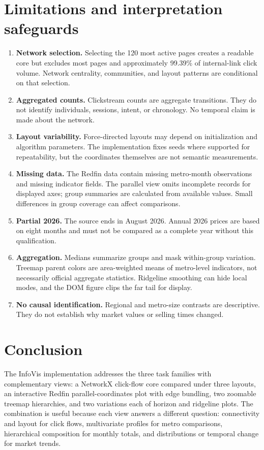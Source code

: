 \documentclass[11pt,letterpaper]{article}
\begin{document}
\section{Limitations and interpretation safeguards}
\begin{enumerate}[leftmargin=*]
  \item \textbf{Network selection.} Selecting the 120 most active pages creates a readable core but excludes most pages and approximately 99.39\% of internal-link click volume. Network centrality, communities, and layout patterns are conditional on that selection.
  \item \textbf{Aggregated counts.} Clickstream counts are aggregate transitions. They do not identify individuals, sessions, intent, or chronology. No temporal claim is made about the network.
  \item \textbf{Layout variability.} Force-directed layouts may depend on initialization and algorithm parameters. The implementation fixes seeds where supported for repeatability, but the coordinates themselves are not semantic measurements.
  \item \textbf{Missing data.} The Redfin data contain missing metro-month observations and missing indicator fields. The parallel view omits incomplete records for displayed axes; group summaries are calculated from available values. Small differences in group coverage can affect comparisons.
  \item \textbf{Partial 2026.} The source ends in August 2026. Annual 2026 prices are based on eight months and must not be compared as a complete year without this qualification.
  \item \textbf{Aggregation.} Medians summarize groups and mask within-group variation. Treemap parent colors are area-weighted means of metro-level indicators, not necessarily official aggregate statistics. Ridgeline smoothing can hide local modes, and the DOM figure clips the far tail for display.
  \item \textbf{No causal identification.} Regional and metro-size contrasts are descriptive. They do not establish why market values or selling times changed.
\end{enumerate}

\section{Conclusion}
The InfoVis implementation addresses the three task families with complementary views: a NetworkX click-flow core compared under three layouts, an interactive Redfin parallel-coordinates plot with edge bundling, two zoomable treemap hierarchies, and two variations each of horizon and ridgeline plots. The combination is useful because each view answers a different question: connectivity and layout for click flows, multivariate profiles for metro comparisons, hierarchical composition for monthly totals, and distributions or temporal change for market trends.
\end{document}

